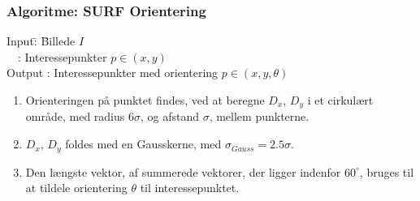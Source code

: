 \subsubsection*{Algoritme: SURF Orientering}
\begin{tabbing}
Input\quad \= : \= Billede $I$\\
$\text{ }$ \> : \>  Interessepunkter $p \in (x, y)$ \\
Output \text{ } \> : \> Interessepunkter med orientering $p \in (x, y, \theta)$
\end{tabbing}
\begin{enumerate}
\item Orienteringen på punktet findes, ved at beregne $D_x$, $D_y$ i et cirkulært område, med radius $6\sigma$, og afstand $\sigma$, mellem punkterne. 
\item $D_x$, $D_y$ foldes med en Gausskerne, med $\sigma_{Gauss} = 2.5\sigma $.
\item Den længste vektor, af summerede vektorer, der ligger indenfor $60^{\circ}$, bruges til at tildele orientering $\theta$ til interessepunktet.
\end{enumerate}